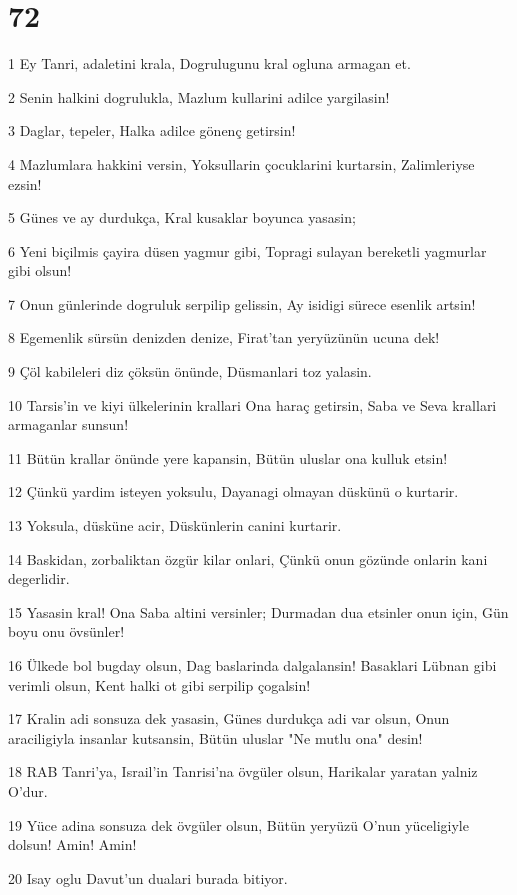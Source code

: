 \chapter{72}

\par 1 Ey Tanri, adaletini krala, Dogrulugunu kral ogluna armagan et.
\par 2 Senin halkini dogrulukla, Mazlum kullarini adilce yargilasin!
\par 3 Daglar, tepeler, Halka adilce gönenç getirsin!
\par 4 Mazlumlara hakkini versin, Yoksullarin çocuklarini kurtarsin, Zalimleriyse ezsin!
\par 5 Günes ve ay durdukça, Kral kusaklar boyunca yasasin;
\par 6 Yeni biçilmis çayira düsen yagmur gibi, Topragi sulayan bereketli yagmurlar gibi olsun!
\par 7 Onun günlerinde dogruluk serpilip gelissin, Ay isidigi sürece esenlik artsin!
\par 8 Egemenlik sürsün denizden denize, Firat'tan yeryüzünün ucuna dek!
\par 9 Çöl kabileleri diz çöksün önünde, Düsmanlari toz yalasin.
\par 10 Tarsis'in ve kiyi ülkelerinin krallari Ona haraç getirsin, Saba ve Seva krallari armaganlar sunsun!
\par 11 Bütün krallar önünde yere kapansin, Bütün uluslar ona kulluk etsin!
\par 12 Çünkü yardim isteyen yoksulu, Dayanagi olmayan düskünü o kurtarir.
\par 13 Yoksula, düsküne acir, Düskünlerin canini kurtarir.
\par 14 Baskidan, zorbaliktan özgür kilar onlari, Çünkü onun gözünde onlarin kani degerlidir.
\par 15 Yasasin kral! Ona Saba altini versinler; Durmadan dua etsinler onun için, Gün boyu onu övsünler!
\par 16 Ülkede bol bugday olsun, Dag baslarinda dalgalansin! Basaklari Lübnan gibi verimli olsun, Kent halki ot gibi serpilip çogalsin!
\par 17 Kralin adi sonsuza dek yasasin, Günes durdukça adi var olsun, Onun araciligiyla insanlar kutsansin, Bütün uluslar "Ne mutlu ona" desin!
\par 18 RAB Tanri'ya, Israil'in Tanrisi'na övgüler olsun, Harikalar yaratan yalniz O'dur.
\par 19 Yüce adina sonsuza dek övgüler olsun, Bütün yeryüzü O'nun yüceligiyle dolsun! Amin! Amin!
\par 20 Isay oglu Davut'un dualari burada bitiyor.

